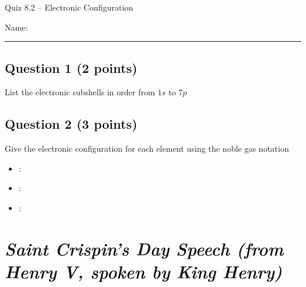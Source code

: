 \documentclass[11pt, letterpaper]{memoir}
\begin{document}
	\begin{center}
		{\large	Quiz 8.2 -- Electronic Configuration}
	\end{center}
{\large Name: \rule[-1mm]{4in}{.1pt}
	
	\subsection*{Question 1 (2 points)}
	List the electronic subshells in order from $1s$ to $7p$
	
	\vspace{10em}
	\subsection*{Question 2 (3 points)}
	Give the electronic configuration for each element using the noble gas notation
	
	\begin{itemize}
		\item {}:
		\item \vspace{4em} :
		\item \vspace{4em} :
	\end{itemize}


	
\newpage
\pagestyle{empty}
\addtocounter{page}{-1}
\section*{\emph{Saint Crispin's Day Speech (from \emph{Henry V}, spoken by King Henry)}}
}
\end{document}

